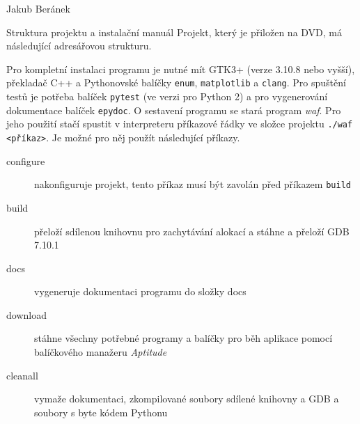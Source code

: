 \documentclass[bc,male,python,dept460]{diploma}						%
\newcommand{\parspace}[1][]{
	\ifthenelse{\isempty{#1}}{\vspace{5mm}}{\vspace{#1}}
	\par
}
\begin{document}
\bigskip
\begin{flushright}
Jakub Beránek
\end{flushright}

\printbibliography %

\appendix
\begin{section}{Struktura projektu a instalační manuál}
\label{appendix:manual}
	Projekt, který je přiložen na DVD, má následující adresářovou strukturu.
	
	\vspace{5mm}
	
	
	\parspace Pro kompletní instalaci programu je nutné mít GTK3+ (verze 3.10.8 nebo vyšší), překladač C++ a Pythonovské balíčky \texttt{enum},
	\texttt{matplotlib} a \texttt{clang}. Pro spuštění testů je potřeba balíček \texttt{pytest} (ve verzi pro Python 2) a
	pro vygenerování dokumentace balíček \texttt{epydoc}. O sestavení programu se stará program \textit{waf}. Pro jeho použití stačí spustit v interpreteru
	příkazové řádky ve složce projektu \texttt{./waf <příkaz>}. Je možné pro něj použít následující příkazy.
	
	\begin{description}
		\item[configure] nakonfiguruje projekt, tento příkaz musí být zavolán před příkazem \texttt{build}
		\item[build] přeloží sdílenou knihovnu pro zachytávání alokací a stáhne a přeloží GDB 7.10.1
		\item[docs] vygeneruje dokumentaci programu do složky docs
		\item[download] stáhne všechny potřebné programy a balíčky pro běh aplikace pomocí balíčkového manažeru \textit{Aptitude}
		\item[cleanall] vymaže dokumentaci, zkompilované soubory sdílené knihovny a GDB a soubory s byte kódem Pythonu
	\end{description}
	

\end{section}
\end{document}
